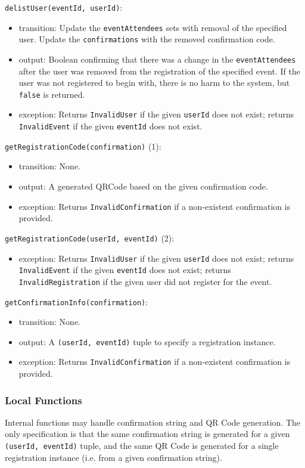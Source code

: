 \documentclass[12pt, titlepage]{article}
\begin{document}
\noindent \texttt{delistUser(eventId, userId)}:
\begin{itemize}
  \item transition: Update the \texttt{eventAttendees} sets with removal of the specified user. Update the
    \texttt{confirmations} with the removed confirmation code.
  \item output: Boolean confirming that there was a change in the \texttt{eventAttendees} after the user was removed
    from the registration of the specified event. If the user was not registered to begin with, there is no harm to the
    system, but \texttt{false} is returned.
\item exception: Returns \texttt{InvalidUser} if the given \texttt{userId} does not exist; returns \texttt{InvalidEvent}
  if the given \texttt{eventId} does not exist.
\end{itemize}

\noindent \texttt{getRegistrationCode(confirmation)} (1):
\begin{itemize}
  \item transition: None.
  \item output: A generated QRCode based on the given confirmation code.
\item exception: Returns \texttt{InvalidConfirmation} if a non-existent confirmation is provided.
\end{itemize}

\noindent \texttt{getRegistrationCode(userId, eventId)} (2):
\begin{itemize}
  \item exception: Returns \texttt{InvalidUser} if the given \texttt{userId} does not exist; returns
    \texttt{InvalidEvent} if the given \texttt{eventId} does not exist; returns \texttt{InvalidRegistration} if the
    given user did not register for the event.
\end{itemize}

\noindent \texttt{getConfirmationInfo(confirmation)}:
\begin{itemize}
  \item transition: None.
  \item output: A \texttt{(userId, eventId)} tuple to specify a registration instance.
\item exception: Returns \texttt{InvalidConfirmation} if a non-existent confirmation is provided.
\end{itemize}

\subsubsection{Local Functions}
Internal functions may handle confirmation string and QR Code generation. The only specification is that the same
confirmation string is generated for a given \texttt{(userId, eventId)} tuple, and the same QR Code is generated for a
single registration instance (i.e. from a given confirmation string).
\end{document}
